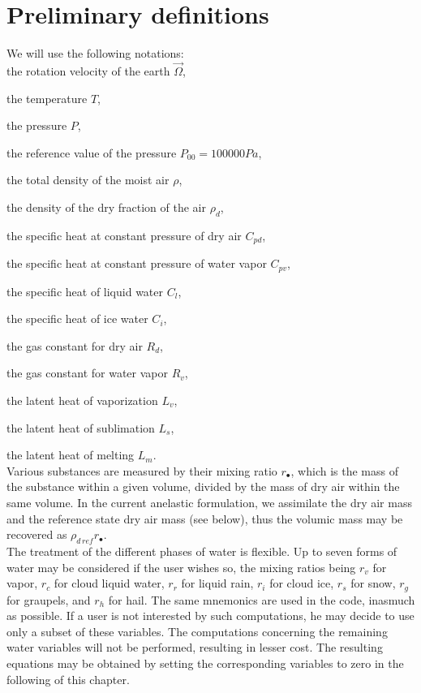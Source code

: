 \section{Preliminary definitions}

We will use the following notations:  \\

the rotation velocity of the earth $\vec \Omega$,

the temperature $T$,

the pressure $P$,

the reference value of the pressure $P_{00}=100000 Pa$,

the total density of the moist air $\rho$,

the density of the dry fraction of the air $\rho_d$,

the specific heat at constant pressure of dry air $C_{pd}$,

the specific heat at constant pressure of water vapor $C_{pv}$,

the specific heat of liquid water $C_l$,

the specific heat of ice water $C_i$,

the gas constant for dry air  $R_d$,

the gas constant for water vapor $R_v$,

the latent heat of vaporization $L_v$,

the latent heat of sublimation $L_s$,

the latent heat of melting $L_m$.
\\


Various substances are measured by their mixing ratio $r_\bullet$, which is the
mass of the substance within a given volume, divided by the mass of dry air
within the same volume. In the current anelastic formulation, we assimilate
the dry air mass and the reference state dry air mass (see below), thus
the volumic mass may be recovered as $\rho_{d\,ref} r_{\bullet}$. \\

The treatment of the different phases of water is flexible.
Up to seven forms of water may be considered if the user wishes so, the
mixing ratios being $r_v$ for vapor, $r_c$ for cloud liquid water, $r_r$ for
liquid rain, $r_i$ for cloud ice, $r_s$ for snow, $r_g$ for graupels, and
$r_h$ for hail. The same mnemonics are used in the code, inasmuch as possible.
If a user is not interested by such computations, he may decide to use only a
subset of these variables. The computations concerning the remaining
water variables will not be performed, resulting in lesser cost. The
resulting equations may be obtained by setting the corresponding variables
to zero in the following of this chapter.\\

